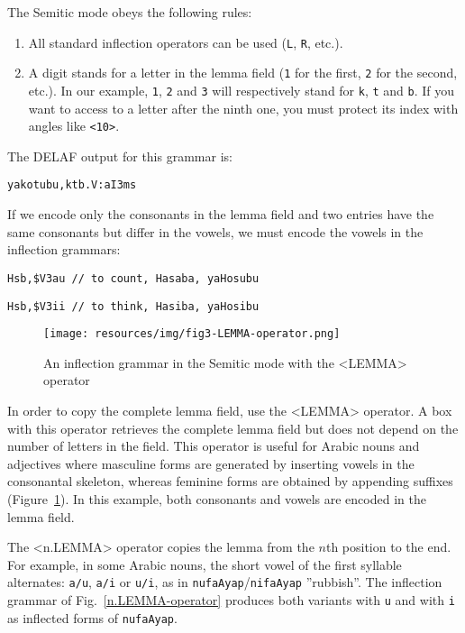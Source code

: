 \noindent The Semitic mode obeys the following rules:
\begin{enumerate}
  \item All standard inflection operators can be used (\verb+L+, \verb+R+, etc.).
  \item A digit stands for a letter in the lemma field (\verb+1+ for the first,
  \verb+2+ for the second, etc.). In our example, \verb+1+, \verb+2+ and
  \verb+3+ will respectively stand for \verb+k+, \verb+t+ and
  \verb+b+. If you want to access to a letter after the ninth one, you must
  protect its index with angles like \verb+<10>+.
\end{enumerate}  

\noindent The DELAF output for this grammar is:
  
\verb+yakotubu,ktb.V:aI3ms+

\bigskip
\noindent If we encode only the consonants in the lemma field and  two entries have the same consonants
but differ in the vowels, we must encode the vowels in the inflection grammars:

\verb+Hsb,$V3au	// to count, Hasaba, yaHosubu+

\verb+Hsb,$V3ii	// to think, Hasiba, yaHosibu+

\begin{figure}[!ht]
\begin{center}
\texttt{[image: resources/img/fig3-LEMMA-operator.png]}
\caption{An inflection grammar in the Semitic mode with the <LEMMA> operator\label{LEMMA-operator}}
\end{center}
\end{figure}

\bigskip
\noindent In order to copy the complete lemma field, use the <LEMMA> operator.
A box with this operator retrieves the complete lemma field but does not depend on
the number of letters in the field. This operator is useful for Arabic nouns and adjectives where
masculine forms are generated by inserting vowels in the consonantal skeleton, whereas
feminine forms are obtained by appending suffixes (Figure~\ref{LEMMA-operator}). In this example,
both consonants and vowels are encoded in the lemma field.

\bigskip
\noindent The <n.LEMMA> operator copies the lemma from the $n$th position to the end.
For example, in some Arabic nouns, the short vowel of the first syllable alternates: \verb+a/u+,
\verb+a/i+ or \verb+u/i+, as in \verb+nufaAyap+/\verb+nifaAyap+ ''rubbish''. The inflection grammar of
Fig.~\ref{n.LEMMA-operator} produces both variants with  \verb+u+ and with  \verb+i+ as inflected forms
of \verb+nufaAyap+.

